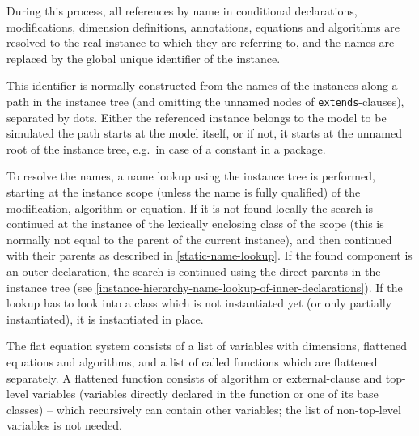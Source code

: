 During this process, all references by name in conditional declarations,
modifications, dimension definitions, annotations, equations and
algorithms are resolved to the real instance to which they are referring
to, and the names are replaced by the global unique identifier of the
instance.

\begin{nonnormative}
This identifier is normally constructed from the names of the instances along a path in the instance tree (and omitting the unnamed nodes of \lstinline!extends!-clauses), separated by dots.
Either the referenced instance belongs to the model to be simulated the path starts at the model itself, or if not, it starts at the unnamed root of the instance tree, e.g.\ in case of a constant in a package.
\end{nonnormative}

\begin{nonnormative}
To resolve the names, a name lookup using the instance tree is performed, starting at the instance scope (unless the name is fully qualified) of the modification, algorithm
or equation.  If it is not found locally the search is continued at the instance of the lexically enclosing class of the scope (this is normally not equal to the parent of
the current instance), and then continued with their parents as described in \cref{static-name-lookup}.  If the found component is an outer declaration, the search is
continued using the direct parents in the instance tree (see \cref{instance-hierarchy-name-lookup-of-inner-declarations}).  If the lookup has to look into a class which
is not instantiated yet (or only partially instantiated), it is instantiated in place.
\end{nonnormative}

The flat equation system consists of a list of variables with dimensions, flattened equations and algorithms, and a list of called functions which are flattened separately.
A flattened function consists of algorithm or external-clause and top-level variables (variables directly declared in the function or one of its base classes) -- which recursively can contain other variables; the list of non-top-level variables is not needed.

